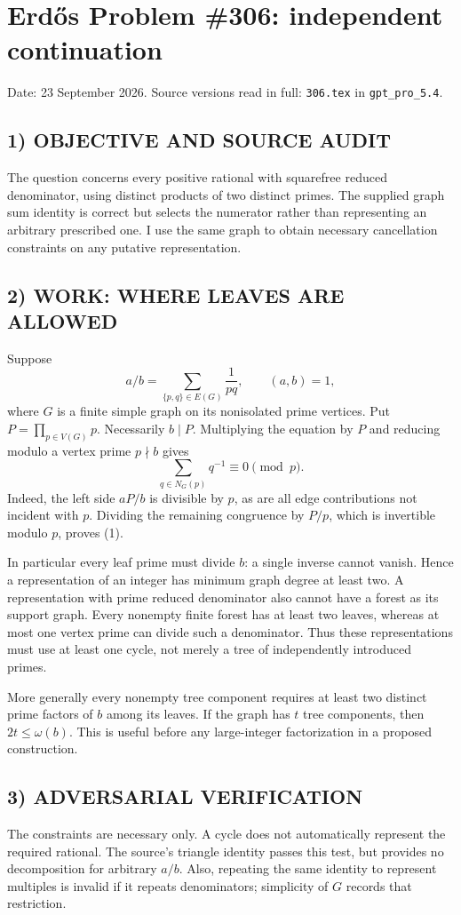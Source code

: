 \section{Erd\H{o}s Problem \#306: independent continuation}
\noindent Date: 23 September 2026. Source versions read in full: \texttt{306.tex} in \texttt{gpt\_pro\_5.4}.

\subsection*{1) OBJECTIVE AND SOURCE AUDIT}
The question concerns every positive rational with squarefree reduced
denominator, using distinct products of two distinct primes. The supplied
graph sum identity is correct but selects the numerator rather than
representing an arbitrary prescribed one. I use the same graph to obtain
necessary cancellation constraints on any putative representation.

\subsection*{2) WORK: WHERE LEAVES ARE ALLOWED}
Suppose
\[
 a/b=\sum_{\{p,q\}\in E(G)}\frac1{pq},\qquad (a,b)=1,
\]
where $G$ is a finite simple graph on its nonisolated prime vertices.
Put $P=\prod_{p\in V(G)}p$. Necessarily $b\mid P$. Multiplying the equation
by $P$ and reducing modulo a vertex prime $p\nmid b$ gives
\[
 \sum_{q\in N_G(p)}q^{-1}\equiv0\pmod p. \tag{1}
\]
Indeed, the left side $aP/b$ is divisible by $p$, as are all edge
contributions not incident with $p$. Dividing the remaining congruence
by $P/p$, which is invertible modulo $p$, proves (1).

In particular every leaf prime must divide $b$: a single inverse cannot
vanish. Hence a representation of an integer has minimum graph degree
at least two. A representation with prime reduced denominator also
cannot have a forest as its support graph. Every nonempty finite forest
has at least two leaves, whereas at most one vertex prime can divide
such a denominator. Thus these representations must use at least one
cycle, not merely a tree of independently introduced primes.

More generally every nonempty tree component requires at least two
distinct prime factors of $b$ among its leaves. If the graph has $t$
tree components, then $2t\le\omega(b)$. This is useful before any
large-integer factorization in a proposed construction.

\subsection*{3) ADVERSARIAL VERIFICATION}
The constraints are necessary only. A cycle does not automatically
represent the required rational. The source's triangle identity passes
this test, but provides no decomposition for arbitrary $a/b$.
Also, repeating the same identity to represent multiples is invalid if
it repeats denominators; simplicity of $G$ records that restriction.

